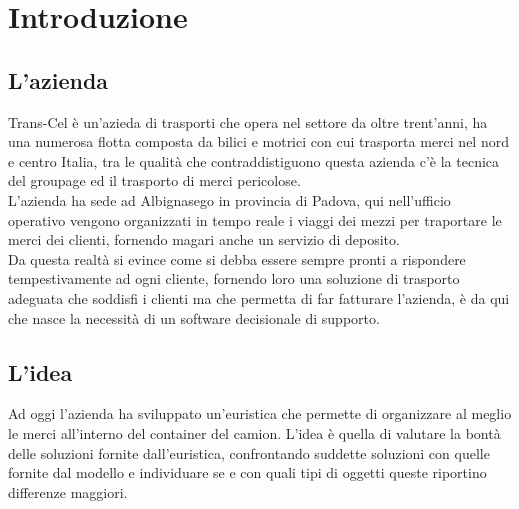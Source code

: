 
\chapter*{Introduzione}
\label{introduzione}
\section{L'azienda}
Trans-Cel è un'azieda di trasporti che opera nel settore da oltre trent'anni, ha una numerosa flotta composta da bilici e motrici con cui trasporta merci nel nord e centro Italia, tra le qualità che contraddistiguono questa azienda c'è la tecnica del groupage ed il trasporto di merci pericolose.\\
L'azienda ha sede ad Albignasego in provincia di Padova, qui nell'ufficio operativo vengono organizzati in tempo reale i viaggi dei mezzi per traportare le merci dei clienti, fornendo magari anche un servizio di deposito.\\
Da questa realtà si evince come si debba essere sempre pronti a rispondere tempestivamente ad ogni cliente, fornendo loro una soluzione di trasporto adeguata che soddisfi i clienti ma che permetta di far fatturare l'azienda, è da qui che nasce la necessità di un software decisionale di supporto.

\section{L'idea}
Ad oggi l'azienda ha sviluppato un'euristica che permette di organizzare al meglio le merci all'interno del container del camion.
L'idea è quella di valutare la bontà delle soluzioni fornite dall'euristica, confrontando suddette soluzioni con quelle fornite dal modello e individuare se e con quali tipi di oggetti queste riportino differenze maggiori.
\newpage
